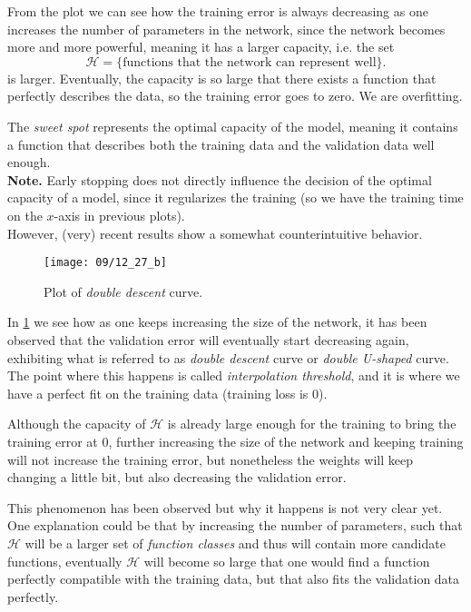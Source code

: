 From the plot we can see how the training error is always decreasing as one increases the number of parameters in the network, since the network becomes more and more powerful, meaning it has a larger capacity, i.e. the set
\begin{equation}
    \mathcal{H} = \{ \text{functions that the network can represent well} \}.
\end{equation}
is larger. Eventually, the capacity is so large that there exists a function that perfectly describes the data, so the training error goes to zero. We are overfitting.

The \emph{sweet spot} represents the optimal capacity of the model, meaning it contains a function that describes both the training data and the validation data well enough. 
\\

\textbf{Note.} Early stopping does not directly influence the decision of the  optimal capacity of a model, since it regularizes the training (so we have the training time on the $x$-axis in previous plots).
\\

However, (very) recent results show a somewhat counterintuitive behavior.
\begin{figure}[H]
    \centering
    \texttt{[image: 09/12\_27\_b]}
    \caption{Plot of \emph{double descent} curve.}
    \label{fig:09:2:double-u-shape}
\end{figure}

In \cref{fig:09:2:double-u-shape} we see how as one keeps increasing the size of the network, it has been observed that the validation error will eventually start decreasing again, exhibiting what is referred to as \emph{double descent} curve or \emph{double U-shaped} curve.
The point where this happens is called \emph{interpolation threshold}, and it is where we have a perfect fit on the training data (training loss is $0$). 

Although the capacity of $\mathcal{H}$ is already large enough for the training to bring the training error at $0$, further increasing the size of the network and keeping training will not increase the training error, but nonetheless the weights will keep changing a little bit, but also decreasing the validation error. 

This phenomenon has been observed but why it happens is not very clear yet.
One explanation could be that by increasing the number of parameters, such that $\mathcal{H}$ will be a larger set of \emph{function classes} and thus will contain more candidate functions, eventually $\mathcal{H}$ will become so large that one would find a function perfectly compatible with the training data, but that also fits the validation data perfectly.

